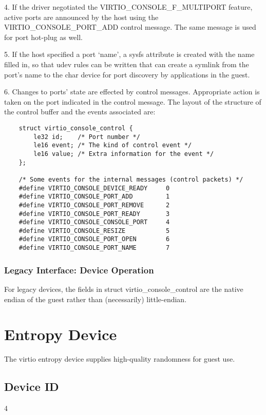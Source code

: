 4. If the driver negotiated the VIRTIO_CONSOLE_F_MULTIPORT
  feature, active ports are announced by the host using the
  VIRTIO_CONSOLE_PORT_ADD control message. The same message is
  used for port hot-plug as well.

5. If the host specified a port `name', a sysfs attribute is
  created with the name filled in, so that udev rules can be
  written that can create a symlink from the port's name to the
  char device for port discovery by applications in the guest.

6. Changes to ports' state are effected by control messages.
  Appropriate action is taken on the port indicated in the
  control message. The layout of the structure of the control
  buffer and the events associated are:

\begin{lstlisting}
	struct virtio_console_control {
		le32 id;    /* Port number */
		le16 event; /* The kind of control event */
		le16 value; /* Extra information for the event */
	};

	/* Some events for the internal messages (control packets) */
	#define VIRTIO_CONSOLE_DEVICE_READY     0
	#define VIRTIO_CONSOLE_PORT_ADD         1
	#define VIRTIO_CONSOLE_PORT_REMOVE      2
	#define VIRTIO_CONSOLE_PORT_READY       3
	#define VIRTIO_CONSOLE_CONSOLE_PORT     4
	#define VIRTIO_CONSOLE_RESIZE           5
	#define VIRTIO_CONSOLE_PORT_OPEN        6
	#define VIRTIO_CONSOLE_PORT_NAME        7
\end{lstlisting}

\subsubsection{Legacy Interface: Device Operation}\label{sec:Device Types / Console Device / Device Operation / Legacy Interface: Device Operation}
For legacy devices, the fields in struct virtio_console_control are the
native endian of the guest rather than (necessarily) little-endian.


\section{Entropy Device}\label{sec:Device Types / Entropy Device}

The virtio entropy device supplies high-quality randomness for
guest use.

\subsection{Device ID}\label{sec:Device Types / Entropy Device / Device ID}
  4

